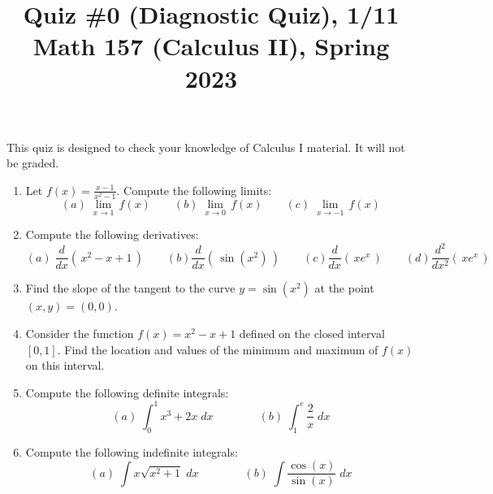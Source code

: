 \documentclass[11pt]{article}
\title{Quiz \#0 (Diagnostic Quiz), 1/11 \\ Math 157 (Calculus II), Spring 2023}
\date{}
\begin{document}
\maketitle

\thispagestyle{empty}

This quiz is designed to check your knowledge of Calculus I material. It will not be graded.

\begin{enumerate}
\item Let $\displaystyle f(x) = \frac{x-1}{x^2-1}$. Compute the following limits:
\[ (a) \; \lim_{x \to 1} \, f(x) \qquad (b) \; \lim_{x \to 0} \, f(x) \qquad (c) \; \lim_{x \to -1} \, f(x)\]

\item Compute the following derivatives:
\[ (a) \; \frac{d}{dx}(\, x^2-x+1\, ) \qquad (b) \frac{d}{dx}(\, \sin(x^2) \,) \qquad (c) \frac{d}{dx} (\, x e^x \,) \qquad (d) \frac{d^2}{dx^2} (\, x e^x \,) \]

\item Find the slope of the tangent to the curve $y= \sin(x^2)$ at the point $(x,y) = (0,0)$.

\item Consider the function $f(x) = x^2-x+1$ defined on the closed interval $[0,1]$. Find the location and values of the minimum and maximum of $f(x)$ on this interval.

\item Compute the following definite integrals:
\[ (a) \; \int_{0}^{1} x^3 + 2x \; dx \qquad \qquad (b) \; \int_{1}^{e} \frac{2}{x} \; dx \]

\item Compute the following indefinite integrals:
\[ (a) \; \int x \sqrt{x^2+1} \; dx \qquad \qquad (b) \; \int \frac{\cos(x)}{\sin(x)} \; dx \]


\end{enumerate}
\end{document}
